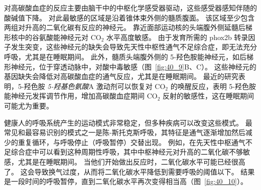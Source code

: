 对高碳酸血症的反应主要由脑干中的中枢化学感受器驱动，这些感受器感知伴随的酸碱值下降。
对此最敏感的区域是沿着锥体束外侧的髓质腹面。
该区域至少包含两组对升高的二氧化碳有反应的神经元。
靠近面部运动核的头端腹外侧延髓后梯形核中的谷氨酸能神经元对 CO$_2$ 水平高度敏感。
由于发育所需的 phox2b 转录因子发生突变，这些神经元的缺失会导致先天性中枢性通气不足综合症，即无法充分呼吸，尤其是在睡眠期间。
此外，髓质头端腹外侧的 5-羟色胺能神经元，如后梯形神经元，位于穿透动脉中，对酸中毒敏感（图~\ref{fig:40_9}B、C）。
这些神经元的基因缺失会降低对高碳酸血症的通气反应，尤其是在睡眠期间。
最近的研究表明，5-羟色胺 \textit{5-羟基色氨酸}A 激动剂可以恢复对 CO$_2$ 的唤醒反应，表明 5-羟色胺能神经元发挥调节作用，增加高碳酸血症期间 CO$_2$ 反射的敏感性，这在睡眠期间可能尤为重要。


健康人的呼吸系统产生的运动模式非常稳定，但多种疾病可以改变这些模式。
最常见和最容易识别的模式之一是陈-斯托克斯呼吸，其特征是通气逐渐增加然后减少的重复循环，与呼吸停止（呼吸暂停）交替出现。
例如，在先天性中枢通气不足综合症中可以看到这种周期性呼吸，其中中枢神经元对升高的二氧化碳不够敏感，尤其是在睡眠期间。 当他们开始做出反应时，二氧化碳水平可能已经很高了。
这会导致换气过度，从而将二氧化碳水平降低到需要呼吸的阈值以下。
结果是一段时间的呼吸暂停，直到二氧化碳水平再次变得相当高（图~\ref{fig:40_10}）。


